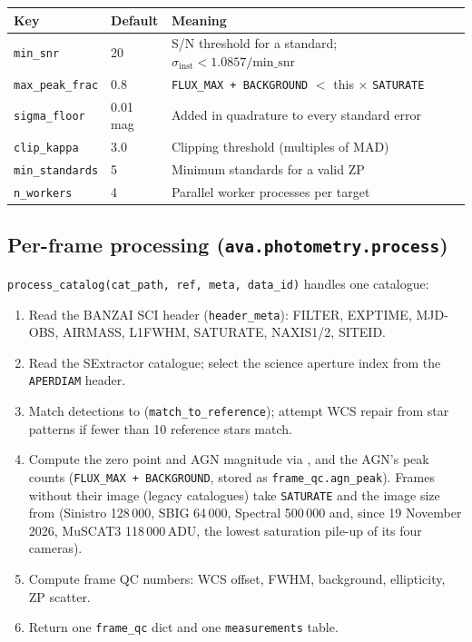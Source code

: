 \documentclass[12pt,a4paper]{article}
\begin{document}
\begin{center}
\small
\begin{tabular}{lll}
\toprule
Key & Default & Meaning \\
\midrule
\texttt{min\_snr}       & 20 & S/N threshold for a standard; $\sigma_\mathrm{inst} < 1.0857 / \mathrm{min\_snr}$ \\
\texttt{max\_peak\_frac}& 0.8 & \texttt{FLUX\_\hspace{0pt}MAX + BACKGROUND} $<$ this $\times$ \texttt{SATURATE} \\
\texttt{sigma\_floor}  & 0.01\,mag & Added in quadrature to every standard error \\
\texttt{clip\_kappa}   & 3.0 & Clipping threshold (multiples of MAD) \\
\texttt{min\_standards}& 5   & Minimum standards for a valid ZP \\
\texttt{n\_workers}    & 4   & Parallel worker processes per target \\
\bottomrule
\end{tabular}
\end{center}

\subsection{Per-frame processing (\texorpdfstring{\texttt{ava.photometry.process}}{ava.photometry.process})}

\texttt{process\_\hspace{0pt}catalog(cat\_\hspace{0pt}path, ref, meta, data\_\hspace{0pt}id)} handles one catalogue:

\begin{enumerate}
  \item Read the BANZAI SCI header (\texttt{header\_meta}): FILTER, EXPTIME,
        MJD-OBS, AIRMASS, L1FWHM, SATURATE, NAXIS1/2, SITEID.
  \item Read the SExtractor catalogue; select the science aperture index from
        the \texttt{APERDIAM} header.
  \item Match detections to  (\texttt{match\_\hspace{0pt}to\_\hspace{0pt}reference});
        attempt WCS repair from star patterns if fewer than 10 reference stars match.
  \item Compute the zero point and AGN magnitude via , and the AGN's peak counts
        (\texttt{FLUX\_MAX + BACKGROUND}, stored as \texttt{frame\_qc.agn\_peak}).
        Frames without their image (legacy catalogues) take \texttt{SATURATE} and the image size from
         (Sinistro 128\,000, SBIG 64\,000, Spectral 500\,000 and,
        since 19 November 2026, MuSCAT3 118\,000\,ADU, the lowest saturation pile-up of its four cameras).
  \item Compute frame QC numbers: WCS offset, FWHM, background, ellipticity, ZP scatter.
  \item Return one \texttt{frame\_qc} dict and one \texttt{measurements} table.
\end{enumerate}
\end{document}
